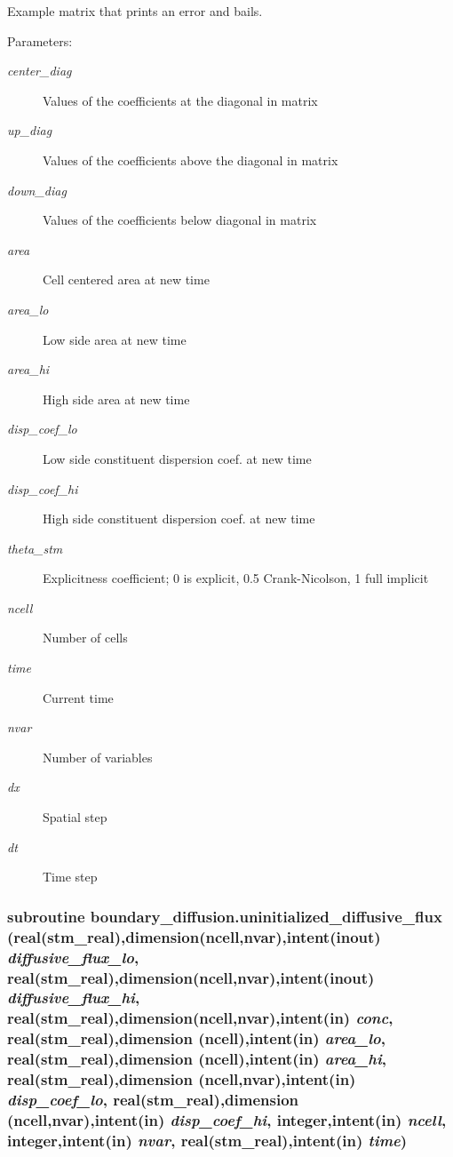 Example matrix that prints an error and bails. 

\begin{Desc}
\item[Parameters:]
\begin{description}
\item[{\em center\_\-diag}]Values of the coefficients at the diagonal in matrix\item[{\em up\_\-diag}]Values of the coefficients above the diagonal in matrix\item[{\em down\_\-diag}]Values of the coefficients below diagonal in matrix\item[{\em area}]Cell centered area at new time \item[{\em area\_\-lo}]Low side area at new time\item[{\em area\_\-hi}]High side area at new time \item[{\em disp\_\-coef\_\-lo}]Low side constituent dispersion coef. at new time\item[{\em disp\_\-coef\_\-hi}]High side constituent dispersion coef. at new time\item[{\em theta\_\-stm}]Explicitness coefficient; 0 is explicit, 0.5 Crank-Nicolson, 1 full implicit \item[{\em ncell}]Number of cells\item[{\em time}]Current time\item[{\em nvar}]Number of variables\item[{\em dx}]Spatial step \item[{\em dt}]Time step \end{description}
\end{Desc}
\hypertarget{a00054_c27cf26f93c52ce9d432267264793736}{
\subsubsection[{uninitialized\_\-diffusive\_\-flux}]{\setlength{\rightskip}{0pt plus 5cm}subroutine boundary\_\-diffusion.uninitialized\_\-diffusive\_\-flux (real(stm\_\-real),dimension(ncell,nvar),intent(inout) {\em diffusive\_\-flux\_\-lo}, \/  real(stm\_\-real),dimension(ncell,nvar),intent(inout) {\em diffusive\_\-flux\_\-hi}, \/  real(stm\_\-real),dimension(ncell,nvar),intent(in) {\em conc}, \/  real(stm\_\-real),dimension         (ncell),intent(in) {\em area\_\-lo}, \/  real(stm\_\-real),dimension         (ncell),intent(in) {\em area\_\-hi}, \/  real(stm\_\-real),dimension (ncell,nvar),intent(in) {\em disp\_\-coef\_\-lo}, \/  real(stm\_\-real),dimension (ncell,nvar),intent(in) {\em disp\_\-coef\_\-hi}, \/  integer,intent(in) {\em ncell}, \/  integer,intent(in) {\em nvar}, \/  real(stm\_\-real),intent(in) {\em time})}}
\label{a00054_c27cf26f93c52ce9d432267264793736}


